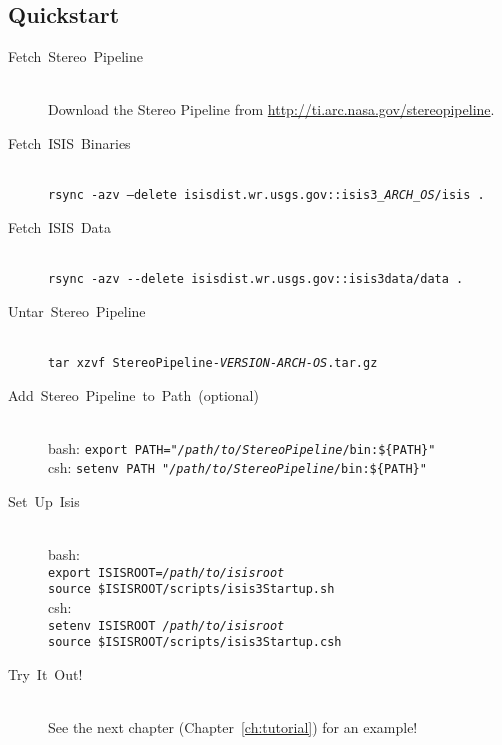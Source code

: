 \subsection{Quickstart}
\begin{description}

\item[{Fetch~Stereo~Pipeline}] ~\\
Download the Stereo Pipeline from \url{http://ti.arc.nasa.gov/stereopipeline}.

\item [{Fetch~ISIS~Binaries}] ~\\
\texttt{rsync -azv --delete isisdist.wr.usgs.gov::isis3\_\textit{ARCH\_OS}/isis .}

\item [{Fetch~ISIS~Data}] ~\\
\verb#rsync -azv --delete isisdist.wr.usgs.gov::isis3data/data .#

\item [{Untar~Stereo~Pipeline}] ~\\
\texttt{tar xzvf StereoPipeline-\textit{VERSION-ARCH-OS}.tar.gz}

\item [{Add~Stereo~Pipeline~to~Path~(optional)}] ~\\
bash: \texttt{export PATH="\textit{/path/to/StereoPipeline}/bin:\$\{PATH\}"} \\
csh:  \texttt{setenv PATH "\textit{/path/to/StereoPipeline}/bin:\$\{PATH\}"}

\pagebreak
\item[Set~Up~Isis] ~\\
bash: \\
\hspace*{2em}\texttt{export ISISROOT=\textit{/path/to/isisroot}} \\
\hspace*{2em}\texttt{source \$ISISROOT/scripts/isis3Startup.sh} \\
csh: \\
\hspace*{2em}\texttt{setenv ISISROOT \textit{/path/to/isisroot}} \\
\hspace*{2em}\texttt{source \$ISISROOT/scripts/isis3Startup.csh}

\item [{Try~It~Out!}] ~\\
See the next chapter (Chapter~\ref{ch:tutorial}) for an example!
\end{description}


